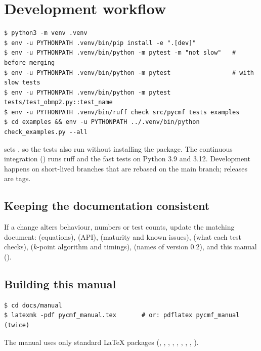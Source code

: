 \section{Development workflow}

\begin{lstlisting}[style=shell]
$ python3 -m venv .venv
$ env -u PYTHONPATH .venv/bin/pip install -e ".[dev]"
$ env -u PYTHONPATH .venv/bin/python -m pytest -m "not slow"   # before merging
$ env -u PYTHONPATH .venv/bin/python -m pytest                 # with slow tests
$ env -u PYTHONPATH .venv/bin/python -m pytest tests/test_obmp2.py::test_name
$ env -u PYTHONPATH .venv/bin/ruff check src/pycmf tests examples
$ cd examples && env -u PYTHONPATH ../.venv/bin/python check_examples.py --all
\end{lstlisting}

 sets , so the tests also run without
installing the package. The continuous integration
() runs ruff and the fast tests on Python 3.9
and 3.12. Development happens on short-lived  branches
that are rebased on the main branch; releases are tags.

\subsection*{Keeping the documentation consistent}

If a change alters behaviour, numbers or test counts, update the matching
document:  (equations),  (API),
 (maturity and known issues),
 (what each test checks), 
($k$-point algorithm and timings),  (names of
version 0.2), and this manual ().

\subsection*{Building this manual}

\begin{lstlisting}[style=shell]
$ cd docs/manual
$ latexmk -pdf pycmf_manual.tex       # or: pdflatex pycmf_manual (twice)
\end{lstlisting}

The manual uses only standard \LaTeX{} packages (,
, , , ,
, , , ).

